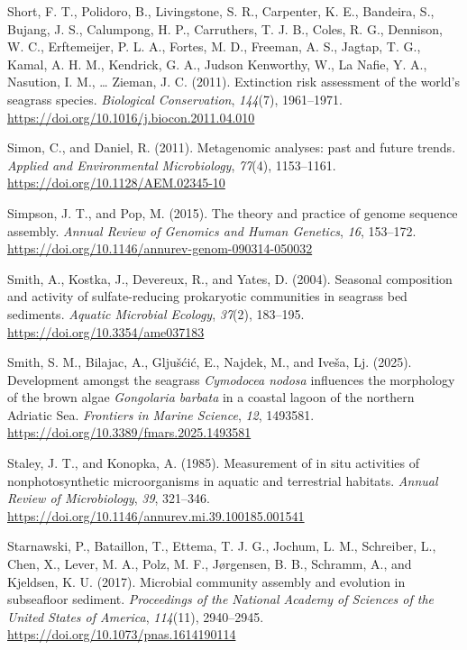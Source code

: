 \documentclass[
  12 pt,
]{book}
\newlength{\cslhangindent}
\newlength{\cslentryspacingunit} %
\newenvironment{CSLReferences}[2] %
 {%
  \setlength{\parindent}{0pt}
  \ifodd #1
  \let\oldpar\par
  \def\par{\hangindent=\cslhangindent\oldpar}
  \fi
  \setlength{\parskip}{#2\cslentryspacingunit}
 }%
 {}
\begin{document}
\begin{CSLReferences}{1}{0}
\leavevmode{}%
Short, F. T., Polidoro, B., Livingstone, S. R., Carpenter, K. E., Bandeira, S., Bujang, J. S., Calumpong, H. P., Carruthers, T. J. B., Coles, R. G., Dennison, W. C., Erftemeijer, P. L. A., Fortes, M. D., Freeman, A. S., Jagtap, T. G., Kamal, A. H. M., Kendrick, G. A., Judson Kenworthy, W., La Nafie, Y. A., Nasution, I. M., \ldots{} Zieman, J. C. (2011). Extinction risk assessment of the world's seagrass species. \emph{Biological Conservation}, \emph{144}(7), 1961--1971. \url{https://doi.org/10.1016/j.biocon.2011.04.010}

\leavevmode{}%
Simon, C., and Daniel, R. (2011). Metagenomic analyses: past and future trends. \emph{Applied and Environmental Microbiology}, \emph{77}(4), 1153--1161. \url{https://doi.org/10.1128/AEM.02345-10}

\leavevmode{}%
Simpson, J. T., and Pop, M. (2015). The theory and practice of genome sequence assembly. \emph{Annual Review of Genomics and Human Genetics}, \emph{16}, 153--172. \url{https://doi.org/10.1146/annurev-genom-090314-050032}

\leavevmode{}%
Smith, A., Kostka, J., Devereux, R., and Yates, D. (2004). Seasonal composition and activity of sulfate-reducing prokaryotic communities in seagrass bed sediments. \emph{Aquatic Microbial Ecology}, \emph{37}(2), 183--195. \url{https://doi.org/10.3354/ame037183}

\leavevmode{}%
Smith, S. M., Bilajac, A., Gljušćić, E., Najdek, M., and Iveša, Lj. (2025). Development amongst the seagrass {{{\emph{Cymodocea nodosa}}} influences the morphology of the brown algae {{\emph{Gongolaria barbata}}} in a coastal lagoon of the northern Adriatic Sea}. \emph{Frontiers in Marine Science}, \emph{12}, 1493581. \url{https://doi.org/10.3389/fmars.2025.1493581}

\leavevmode{}%
Staley, J. T., and Konopka, A. (1985). Measurement of in situ activities of nonphotosynthetic microorganisms in aquatic and terrestrial habitats. \emph{Annual Review of Microbiology}, \emph{39}, 321--346. \url{https://doi.org/10.1146/annurev.mi.39.100185.001541}

\leavevmode{}%
Starnawski, P., Bataillon, T., Ettema, T. J. G., Jochum, L. M., Schreiber, L., Chen, X., Lever, M. A., Polz, M. F., Jørgensen, B. B., Schramm, A., and Kjeldsen, K. U. (2017). Microbial community assembly and evolution in subseafloor sediment. \emph{Proceedings of the National Academy of Sciences of the United States of America}, \emph{114}(11), 2940--2945. \url{https://doi.org/10.1073/pnas.1614190114}


\end{CSLReferences}
\end{document}
